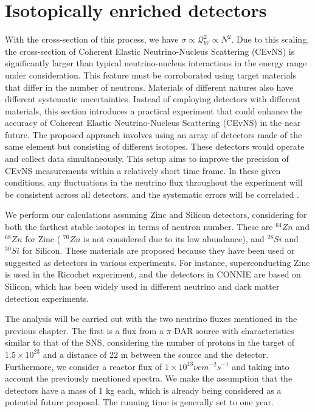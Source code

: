 \chapter{Isotopically enriched detectors}\label{cap:analisis}

With the cross-section of this process, we have $\sigma \propto \mathcal{Q}^2_W \propto N^2$. 
Due to this scaling, the cross-section of Coherent Elastic Neutrino-Nucleus Scattering (CEvNS) is significantly larger than typical neutrino-nucleus interactions in the energy range under consideration. This feature must be corroborated using target materials that differ in the number of neutrons. Materials of different natures also have different systematic uncertainties. Instead of employing detectors with different materials, this section introduces a practical experiment that could enhance the accuracy of Coherent Elastic Neutrino-Nucleus Scattering (CEvNS) in the near future. The proposed approach involves using an array of detectors made of the same element but consisting of different isotopes. These detectors would operate and collect data simultaneously. This setup aims to improve the precision of CEvNS measurements within a relatively short time frame.
In these given conditions, any fluctuations in the neutrino flux throughout the experiment will be consistent across all detectors, and the systematic errors will be correlated \cite{Galindo}.

We perform our calculations assuming Zinc and Silicon detectors, considering for both the farthest stable isotopes in terms of neutron number. These are $^{64}Zn$ and  $^{68}Zn$ for Zinc ( $^{70}Zn$ is not considered due to its low abundance), and $^{28}Si$ and $^{30}Si$ for Silicon.
These materials are proposed because they have been used or suggested as detectors in various experiments. For instance, superconducting Zinc is used in the Ricochet experiment, and the detectors in CONNIE are based on Silicon, which has been widely used in different neutrino and dark matter detection experiments.

The analysis will be carried out with the two neutrino fluxes mentioned in the previous chapter.   The first is a flux from a $\pi$-DAR source with characteristics similar to that of the SNS, considering the number of protons in the target of $1.5\times10^{23}$ and a distance of 22 m between the source and the detector.  
Furthermore, we consider a reactor flux of $1\times10^{13} \nu cm^{-2} s^{-1}$ and taking into account the previously mentioned spectra. We make the assumption that the detectors have a mass of 1 kg each, which is already being considered as a potential future proposal. The running time is generally set to one year.



